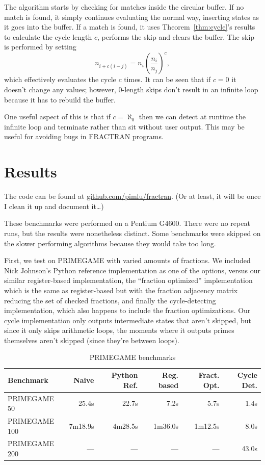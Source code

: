 \documentclass[12pt]{article}
\begin{document}
The algorithm starts by checking for matches inside the circular buffer. If no match is found, it simply continues evaluating the normal way, inserting states as it goes into the buffer. If a match is found, it uses Theorem~\ref{thm:cycle}'s results to calculate the cycle length $c$, performs the skip and clears the buffer. The skip is performed by setting
\[
n_{i + c(i-j)} = n_i \left(\frac{n_i}{n_j}\right)^c,
\]
which effectively evaluates the cycle $c$ times. It can be seen that if $c = 0$ it doesn't change any values; however, 0-length skips don't result in an infinite loop because it has to rebuild the buffer.

One useful aspect of this is that if $c = \aleph_0$ then we can detect at runtime the infinite loop and terminate rather than sit without user output. This may be useful for avoiding bugs in FRACTRAN programs.

\section{Results}

The code can be found at \url{github.com/pimlu/fractran}. (Or at least, it will be once I clean it up and document it\ldots)

These benchmarks were performed on a Pentium G4600. There were no repeat runs, but the results were nonetheless distinct. Some benchmarks were skipped on the slower performing algorithms because they would take too long.

First, we test on PRIMEGAME with varied amounts of fractions. We included Nick Johnson's Python reference implementation as one of the options, versus our similar register-based implementation, the ``fraction optimized'' implementation which is the same as register-based but with the fraction adjacency matrix reducing the set of checked fractions, and finally the cycle-detecting implementation, which also happens to include the fraction optimizations. Our cycle implementation only outputs intermediate states that aren't skipped, but since it only skips arithmetic loops, the moments where it outputs primes themselves aren't skipped (since they're between loops).

\begin{table}[h]
\centering
\begin{tabular}{lrrrrr}
\toprule
Benchmark & Naive & Python Ref. & Reg. based & Fract. Opt. & Cycle Det. \\
\midrule
PRIMEGAME 50  & 25.4s    & 22.7s    & 7.2s    & 5.7s    & 1.4s  \\
PRIMEGAME 100 & 7m18.9s  & 4m28.5s  & 1m36.0s & 1m12.5s & 8.0s  \\
PRIMEGAME 200 & ---      & ---      & ---     & ---     & 43.0s \\
\bottomrule
\end{tabular}
\caption{PRIMEGAME benchmarks}
\end{table}
\end{document}

